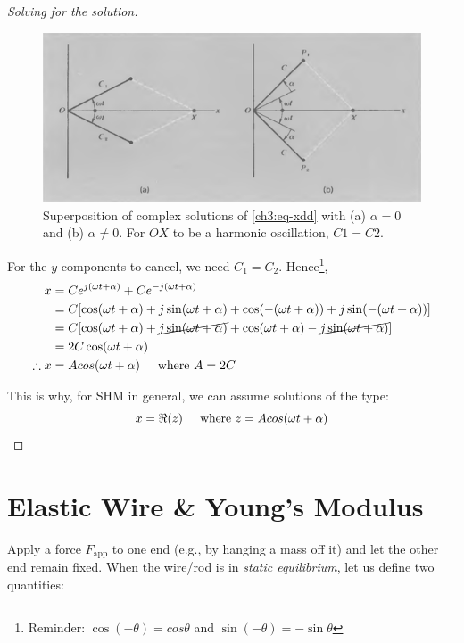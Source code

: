 \documentclass[11pt,letterpaper,titlepage,oneside]{book}
\newcommand{\htab}{\hspace{0.5cm}}
\newcommand{\where}{\htab\text{where }}
\begin{document}
\begin{proof}[Solving for the solution]
\begin{figure}[h]
	\centering
	\includegraphics[scale=0.7]{phys232/Ch3-adding-complex-solutions.png} \caption{Superposition of complex solutions of \eqref{ch3:eq-xdd} with (a) $\alpha=0$ and (b) $\alpha\neq 0$. For $OX$ to be a harmonic oscillation, $C1=C2$.}\label{ch3:fig-complex-sols}
\end{figure}


For the $y$-components to cancel, we need $C_1=C_2$. Hence\footnote{Reminder: $\cos(-\theta)=cos\theta$ and $\sin(-\theta)=-\sin\theta$},
\begin{align*}
x
&=Ce^{j(\omega t +\alpha)} + Ce^{-j(\omega t +\alpha)} \\
&=C[\cos(\omega t + \alpha) + j\sin(\omega t + \alpha) + \cos(-(\omega t + \alpha)) + j\sin(-(\omega t + \alpha))] \\
&=C[\cos(\omega t + \alpha) + \cancel{j\sin(\omega t + \alpha)} + \cos(\omega t + \alpha) - \cancel{j\sin(\omega t + \alpha)}] \\
&= 2C\cos(\omega t + \alpha) \\
\therefore
x &= Acos(\omega t + \alpha) \where A=2C
\end{align*}

This is why, for SHM in general, we can assume solutions of the type:
\begin{equation}
	x=\Re(z) \where z=Acos(\omega t + \alpha)
\end{equation}
\end{proof}


\section{Elastic Wire \& Young's Modulus} \label{ch3:sec-wire}

Apply a force $F_\text{app}$ to one end (e.g., by hanging a mass off it) and let the other end remain fixed. When the wire/rod is in \textit{static equilibrium}, let us define two quantities:
\end{document}
